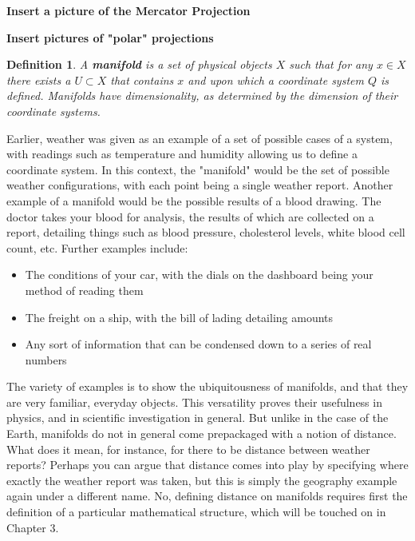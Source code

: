 \documentclass{book}
\newtheorem{defn}[equation]{Definition}
\begin{document}
\textbf{Insert a picture of the Mercator Projection}

\textbf{Insert pictures of "polar" projections}

\begin{defn}
	A \textbf{manifold} is a set of physical objects $X$ such that for any $x \in X$ there exists a $U \subset X$ that contains $x$ and upon which a coordinate system $Q$ is defined. Manifolds have dimensionality, as determined by the dimension of their coordinate systems.
\end{defn}


Earlier, weather was given as an example of a set of possible cases of a system, with readings such as temperature and humidity allowing us to define a coordinate system. In this context, the "manifold" would be the set of possible weather configurations, with each point being a single weather report. Another example of a manifold would be the possible results of a blood drawing. The doctor takes your blood for analysis, the results of which are collected on a report, detailing things such as blood pressure, cholesterol levels, white blood cell count, etc. Further examples include: 

\begin{itemize}
\item The conditions of your car, with the dials on the dashboard being your method of reading them 

\item The freight on a ship, with the bill of lading detailing amounts

\item Any sort of information that can be condensed down to a series of real numbers

\end{itemize}

The variety of examples is to show the ubiquitousness of manifolds, and that they are very familiar, everyday objects. This versatility proves their usefulness in physics, and in scientific investigation in general. But unlike in the case of the Earth, manifolds do not in general come prepackaged with a notion of distance. What does it mean, for instance, for there to be distance between weather reports? Perhaps you can argue that distance comes into play by specifying where exactly the weather report was taken, but this is simply the geography example again under a different name. No, defining distance on manifolds requires first the definition of a particular mathematical structure, which will be touched on in Chapter 3. 
\end{document}

